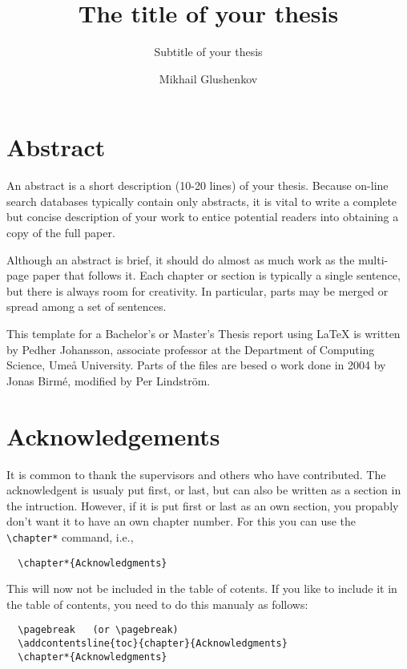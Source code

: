 \documentclass[a4paper,11pt,oneside]{report}
\title{The title of your thesis}
\subtitle{Subtitle of your thesis}
\author{Mikhail Glushenkov}
\begin{document}
\maketitle

\chapter*{Abstract}
An abstract is a short description (10-20 lines) of your thesis. Because on-line
search databases typically contain only abstracts, it is vital to write a
complete but concise description of your work to entice potential readers into
obtaining a copy of the full paper.

Although an abstract is brief, it should do almost as much work as the multi-page
paper that follows it. Each chapter or section is typically a single sentence,
but there is always room for creativity. In particular, parts may be merged or
spread among a set of sentences.

This template for a Bachelor's or Master's Thesis report using {{\LaTeX}} is
written by Pedher Johansson, associate professor at the Department of Computing
Science, Umeå University. Parts of the files are besed o work done in 2004 by
Jonas Birmé, modified by Per Lindström.

\pagebreak

\chapter*{Acknowledgements}

It is common to thank the supervisors and others who have contributed.
The acknowledgent is usualy put first, or last, but can also be
written as a section in the intruction. However, if it is put first
or last as an own section, you propably don't want it to have an own
chapter number. For this you can use the \verb+\chapter*+ command, i.e.,
\begin{verbatim}
  \chapter*{Acknowledgments}
\end{verbatim}
This will now not be included in the table of cotents. If you
like to include it in the table of contents, you need to do this
manualy as follows:
\begin{verbatim}
  \pagebreak   (or \pagebreak)
  \addcontentsline{toc}{chapter}{Acknowledgments}
  \chapter*{Acknowledgments}
\end{verbatim}
\end{document}
